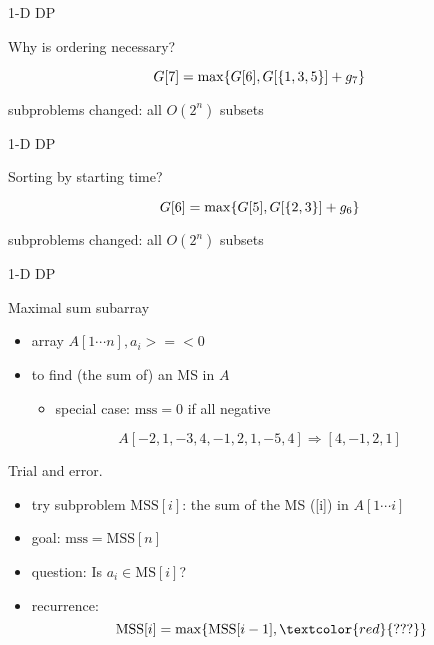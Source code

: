 \begin{frame}{1-D DP}
  \begin{alertblock}{Why is ordering necessary?}

    \[
      G[7] = \max \{G[6], G[\{1,3,5\}] + g_{7}\}
    \]

    \begin{center}
      subproblems changed: all $O(2^{n})$ subsets
    \end{center}
  \end{alertblock}
\end{frame}
\begin{frame}{1-D DP}
  \begin{alertblock}{Sorting by starting time?}

    \[
      G[6] = \max \{G[5], G[\{2,3\}] + g_{6}\}
    \]

    \begin{center}
      subproblems changed: all $O(2^{n})$ subsets
    \end{center}
  \end{alertblock}
\end{frame}
\begin{frame}{1-D DP}
  \begin{exampleblock}{Maximal sum subarray }
    \begin{itemize}
      \item array $A[1 \cdots n], a_{i} >=< 0$
      \item to find (the sum of) an MS in $A$
	\begin{itemize}
	  \item special case: $\text{mss} = 0$ if all negative
	\end{itemize}
    \end{itemize}
	
    \[
      A[-2,1 ,-3,4,-1,2,1,-5,4] \Rightarrow [4,-1,2,1]
    \]
  \end{exampleblock}

  \pause
  \begin{alertblock}{Trial and error.}
    \begin{itemize}
      \item try subproblem $\text{MSS}[i]$: the sum of the MS ([i]) in $A[1 \cdots i]$
      \item goal: $\text{mss} = \text{MSS}[n]$
      \item question: Is $a_{i} \in \text{MS}[i]$?
      \item recurrence: 
	\[ 
	  \text{MSS}[i] = \max \set{\text{MSS}[i-1], \textcolor{red}{???}}
	\]
    \end{itemize}
  \end{alertblock}
\end{frame}
